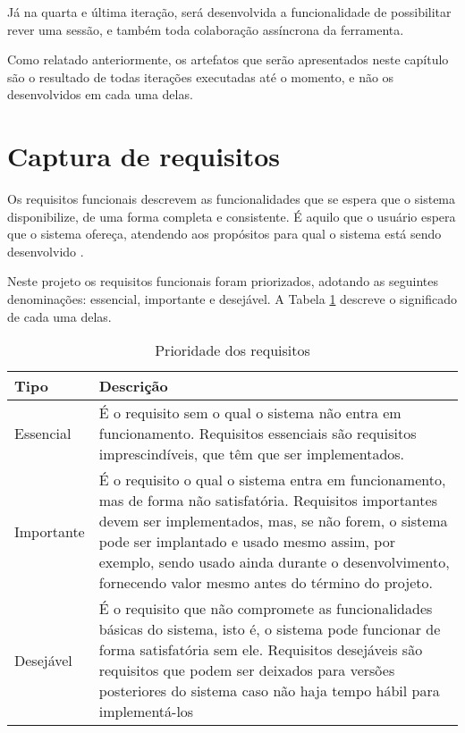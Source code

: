 Já na quarta e última iteração, será desenvolvida a funcionalidade de possibilitar rever uma sessão, e também toda colaboração assíncrona da ferramenta.

Como relatado anteriormente, os artefatos que serão apresentados neste capítulo são o resultado de todas iterações executadas até o momento, e não os desenvolvidos em cada uma delas.

\section{Captura de requisitos}

Os requisitos funcionais descrevem as funcionalidades que se espera que o sistema disponibilize, de uma forma completa e consistente. É aquilo que o usuário espera que o sistema ofereça, atendendo aos propósitos para qual o sistema está sendo desenvolvido \cite{padua}.

Neste projeto os requisitos funcionais foram priorizados, adotando as seguintes denominações: essencial, importante e desejável. A Tabela \ref{tab:prioridade_req} descreve o significado de cada uma delas.

\bgroup
\def\arraystretch{1.5} %
\begin{table}[h]{} %
\caption{Prioridade dos requisitos}
\centering
\begin{tabular}{ | p{3cm} | p{10cm}| } \hline
\textbf{Tipo} & \textbf{Descrição} \\ \hline
Essencial & É o requisito sem o qual o sistema não entra em funcionamento. Requisitos essenciais são requisitos imprescindíveis, que têm que ser implementados.  \\ \hline
Importante  & É o requisito o qual o sistema entra em funcionamento, mas de forma não satisfatória. Requisitos importantes devem ser implementados, mas, se não forem, o sistema pode ser implantado e usado mesmo assim, por exemplo, sendo usado ainda durante o desenvolvimento, fornecendo valor mesmo antes do término do projeto.  \\ \hline
Desejável  & É o requisito que não compromete as funcionalidades básicas do sistema, isto é, o sistema pode funcionar de forma satisfatória sem ele. Requisitos desejáveis são requisitos que podem ser deixados para versões posteriores do sistema caso não haja tempo hábil para implementá-los  \\ \hline
\end{tabular}
\label{tab:prioridade_req}
\end{table}
\egroup

